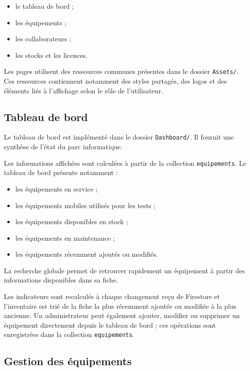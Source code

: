 \documentclass{rapportENSIAS}
\begin{document}
\begin{itemize}
    \item le tableau de bord ;
    \item les équipements ;
    \item les collaborateurs ;
    \item les stocks et les licences.
\end{itemize}

Les pages utilisent des ressources communes présentes dans le dossier \texttt{Assets/}. Ces ressources contiennent notamment des styles partagés, des logos et des éléments liés à l’affichage selon le rôle de l’utilisateur.

\subsection{Tableau de bord}

Le tableau de bord est implémenté dans le dossier \texttt{Dashboard/}. Il fournit une synthèse de l’état du parc informatique.

Les informations affichées sont calculées à partir de la collection \texttt{equipements}. Le tableau de bord présente notamment :

\begin{itemize}
    \item les équipements en service ;
    \item les équipements mobiles utilisés pour les tests ;
    \item les équipements disponibles en stock ;
    \item les équipements en maintenance ;
    \item les équipements récemment ajoutés ou modifiés.
\end{itemize}

La recherche globale permet de retrouver rapidement un équipement à partir des informations disponibles dans sa fiche.

Les indicateurs sont recalculés à chaque changement reçu de Firestore et l’inventaire est trié de la fiche la plus récemment ajoutée ou modifiée à la plus ancienne. Un administrateur peut également ajouter, modifier ou supprimer un équipement directement depuis le tableau de bord ; ces opérations sont enregistrées dans la collection \texttt{equipements}.

\subsection{Gestion des équipements}
\end{document}
